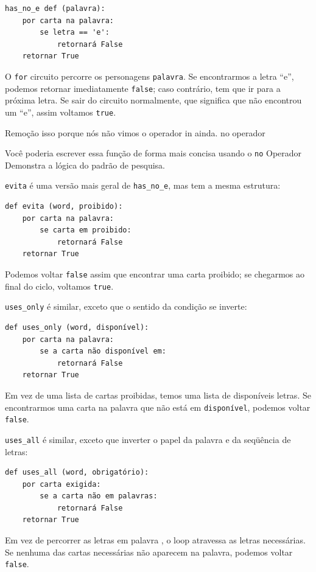 \documentclass[10pt]{book}
\begin{document}
\begin{exercise}
\begin{verbatim}
has_no_e def (palavra):
    por carta na palavra:
        se letra == 'e':
            retornará False
    retornar True
\end{verbatim}
%
O {\tt for} circuito percorre os personagens {\tt palavra}. Se encontrarmos
a letra ``e'', podemos retornar imediatamente {\tt false}; caso contrário,
tem que ir para a próxima letra. Se sair do circuito normalmente, que
significa que não encontrou um ``e'', assim voltamos {\tt true}.

Remoção isso porque nós não vimos o operador in ainda.
\index{} no operador

Você poderia escrever essa função de forma mais concisa usando o {\tt no}
Operador%
Demonstra a lógica do padrão de pesquisa.

{\tt evita} é uma versão mais geral de \verb "has_no_e", mas
tem a mesma estrutura:

\begin{verbatim}
def evita (word, proibido):
    por carta na palavra:
        se carta em proibido:
            retornará False
    retornar True
\end{verbatim}
%
Podemos voltar {\tt false} assim que encontrar uma carta proibido;
se chegarmos ao final do ciclo, voltamos {\tt true}.

\Verb "uses_only" é similar, exceto que o sentido da condição
se inverte:

\begin{verbatim}
def uses_only (word, disponível):
    por carta na palavra: 
        se a carta não disponível em:
            retornará False
    retornar True
\end{verbatim}
%
Em vez de uma lista de cartas proibidas, temos uma lista de disponíveis
letras. Se encontrarmos uma carta na palavra {\tt} que não está em
{\tt disponível}, podemos voltar {\tt false}.

\Verb "uses_all" é similar, exceto que inverter o papel
da palavra e da seqüência de letras:

\begin{verbatim}
def uses_all (word, obrigatório):
    por carta exigida: 
        se a carta não em palavras:
            retornará False
    retornar True
\end{verbatim}
%
Em vez de percorrer as letras em {palavra \tt}, o loop
atravessa as letras necessárias. Se nenhuma das cartas necessárias
não aparecem na palavra, podemos voltar {\tt false}.


\end{exercise}
\end{document}
